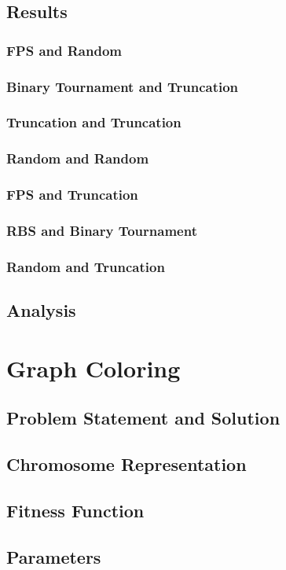 \documentclass[11pt, letterpaper]{article}
\begin{document}
\subsection{Results} 
\subsubsection {FPS and Random}
\subsubsection {Binary Tournament and Truncation}
\subsubsection {Truncation and Truncation}
\subsubsection {Random and Random}
\subsubsection {FPS and Truncation}
\subsubsection {RBS and Binary Tournament}
\subsubsection {Random and Truncation}
\subsection{Analysis}

\section{Graph Coloring}
\subsection{Problem Statement and Solution}
\subsection{Chromosome Representation}
\subsection{Fitness Function}
\subsection{Parameters}
\end{document}
